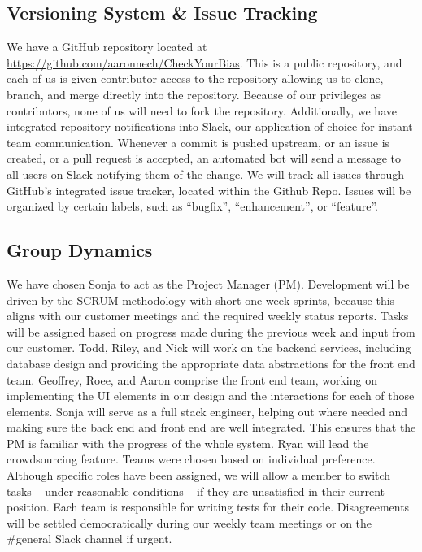 \documentclass[11pt]{article}
\begin{document}
\subsection{Versioning System \& Issue Tracking}

We have a GitHub repository located at \href{https://github.com/aaronnech/CheckYourBias}{https://github.com/aaronnech/CheckYourBias}. This is a public repository, and each of us is given contributor access to the repository allowing us to clone, branch, and merge directly into the repository. Because of our privileges as contributors, none of us will need to fork the repository. Additionally, we have integrated repository notifications into Slack, our application of choice for instant team communication. Whenever a commit is pushed upstream, or an issue is created, or a pull request is accepted, an automated bot will send a message to all users on Slack notifying them of the change. We will track all issues through GitHub’s integrated issue tracker, located within the Github Repo. Issues will be organized by certain labels, such as ``bugfix'', ``enhancement'', or ``feature''.

\subsection{Group Dynamics}

We have chosen Sonja to act as the Project Manager (PM). Development will be driven by the SCRUM methodology with short one-week sprints, because this aligns with our customer meetings and the required weekly status reports. Tasks will be assigned based on progress made during the previous week and input from our customer. Todd, Riley, and Nick will work on the backend services, including database design and providing the appropriate data abstractions for the front end team. Geoffrey, Roee, and Aaron comprise the front end team, working on implementing the UI elements in our design and the interactions for each of those elements. Sonja will serve as a full stack engineer, helping out where needed and making sure the back end and front end are well integrated. This ensures that the PM is familiar with the progress of the whole system. Ryan will lead the crowdsourcing feature. Teams were chosen based on individual preference. Although specific roles have been assigned, we will allow a member to switch tasks -- under reasonable conditions -- if they are unsatisfied in their current position. Each team is responsible for writing tests for their code. Disagreements will be settled democratically during our weekly team meetings or on the \#general Slack channel if urgent.
\end{document}
